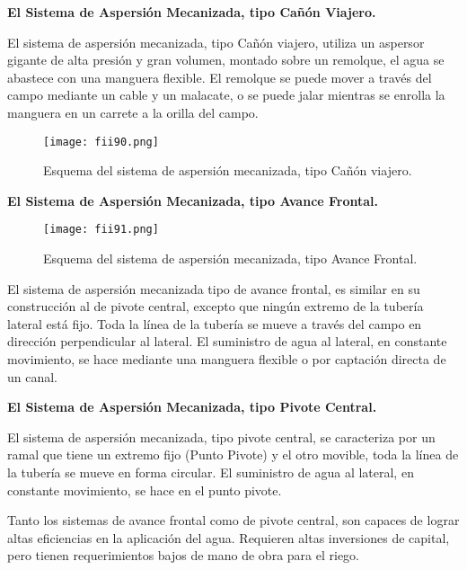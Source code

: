 
\textbf{El Sistema de Aspersión Mecanizada, tipo Cañón Viajero.}

El sistema de aspersión mecanizada, tipo Cañón viajero, utiliza un aspersor
gigante de alta presión y gran volumen, montado sobre un remolque, el agua se
abastece con una manguera flexible. El remolque se puede mover a través del campo
mediante un cable y un malacate, o se puede jalar mientras se enrolla la manguera en
un carrete a la orilla del campo.

\begin{figure}[h!]
	\centerline{\texttt{[image: fii90.png]}}
	\caption{Esquema del sistema de aspersión mecanizada, tipo Cañón viajero.}
	\label{fii90}
\end{figure}

\textbf{El Sistema de Aspersión Mecanizada, tipo Avance Frontal.}

\begin{figure}[h!]
	\centerline{\texttt{[image: fii91.png]}}
	\caption{Esquema del sistema de aspersión mecanizada, tipo Avance Frontal.}
	\label{fii91}
\end{figure}

El sistema de aspersión mecanizada tipo de avance frontal, es similar en su
construcción al de pivote central, excepto que ningún extremo de la tubería lateral está
fijo. Toda la línea de la tubería se mueve a través del campo en dirección perpendicular
al lateral. El suministro de agua al lateral, en constante movimiento, se hace mediante
una manguera flexible o por captación directa de un canal.

\textbf{El Sistema de Aspersión Mecanizada, tipo Pivote Central.}

El sistema de aspersión mecanizada, tipo pivote central, se caracteriza por un
ramal que tiene un extremo fijo (Punto Pivote) y el otro movible, toda la línea de la
tubería se mueve en forma circular. El suministro de agua al lateral, en constante
movimiento, se hace en el punto pivote.

Tanto los sistemas de avance frontal como de pivote central, son capaces de
lograr altas eficiencias en la aplicación del agua. Requieren altas inversiones de capital,
pero tienen requerimientos bajos de mano de obra para el riego.

